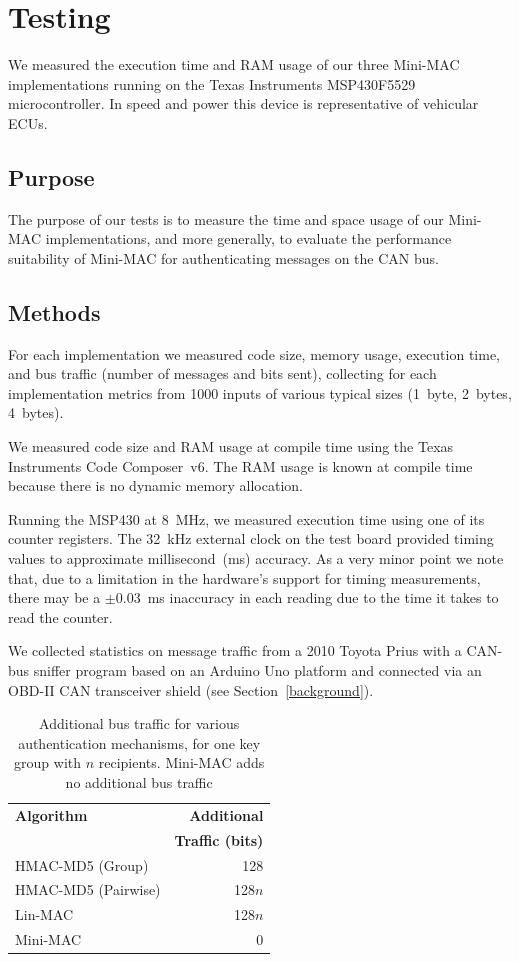 \section{Testing}
\label{testing}

We measured the execution time and RAM usage of our three Mini-MAC implementations 
running on the Texas Instruments MSP430F5529 microcontroller. 
In speed and power this device is representative of vehicular ECUs.

\subsection{Purpose}
\label{purpose}

The purpose of our tests is to measure the time and space usage of our Mini-MAC implementations, and more generally,
to evaluate the performance suitability of Mini-MAC for authenticating messages on the CAN bus.

\subsection{Methods}
\label{methods}

For each implementation we measured code size, memory usage, execution time, 
and bus traffic (number of messages and bits sent),
collecting for each implementation metrics from 1000 inputs of various typical sizes (1~byte, 2~bytes, 4~bytes).  

We measured code size and RAM usage at compile time using 
the Texas Instruments Code Composer~v6.
The RAM usage is known at compile time because there is no
dynamic memory allocation.

Running the MSP430 at 8~MHz,
we measured execution time using one of its counter registers.
The 32~kHz external clock on the test board provided timing values to approximate millisecond~(ms) accuracy.
As a very minor point we note that, due to a limitation in the hardware's
support for timing measurements, 
there may be a $\pm$0.03~ms inaccuracy in each reading due to the
time it takes to read the counter.

We collected statistics on message traffic from a 2010 Toyota Prius with a CAN-bus sniffer program 
based on an Arduino Uno platform and connected via an OBD-II CAN transceiver shield
(see Section~\ref{background}).
	
	\begin{table}
	\centering
	\caption{Additional bus traffic for various authentication mechanisms, 
	for one key group with $n$ recipients.  Mini-MAC adds no additional bus traffic}
	\label{tab-traffic}
	\vspace{8pt}
	\begin{tabular}{l|r}%
	\bfseries Algorithm & \bfseries Additional \\
	& {\bf Traffic (bits)} \\\hline 
	HMAC-MD5 (Group) & 128 \\
	HMAC-MD5 (Pairwise) & 128$n$ \\
	Lin-MAC & 128$n$ \\
	Mini-MAC & 0 \\
	\end{tabular}
	\end{table}

